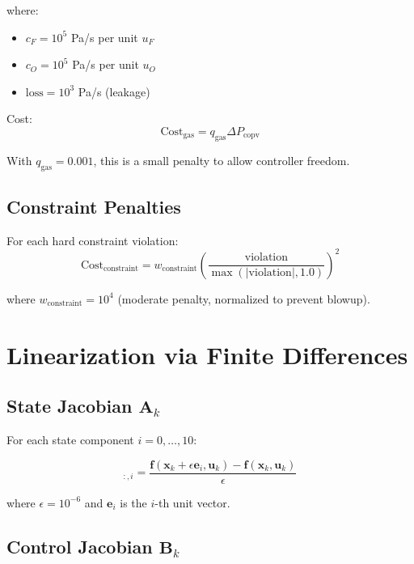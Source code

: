 \documentclass[11pt,a4paper]{article}
\begin{document}
where:
\begin{itemize}
    \item $c_F = 10^5$ Pa/s per unit $u_F$
    \item $c_O = 10^5$ Pa/s per unit $u_O$
    \item $\text{loss} = 10^3$ Pa/s (leakage)
\end{itemize}

Cost:
\begin{equation}
\text{Cost}_{\text{gas}} = q_{\text{gas}} \Delta P_{\text{copv}}
\end{equation}

With $q_{\text{gas}} = 0.001$, this is a small penalty to allow controller freedom.

\subsection{Constraint Penalties}

For each hard constraint violation:
\begin{equation}
\text{Cost}_{\text{constraint}} = w_{\text{constraint}} \left(\frac{\text{violation}}{\max(|\text{violation}|, 1.0)}\right)^2
\end{equation}

where $w_{\text{constraint}} = 10^4$ (moderate penalty, normalized to prevent blowup).

\section{Linearization via Finite Differences}

\subsection{State Jacobian $\mathbf{A}_k$}

For each state component $i = 0, \ldots, 10$:

\begin{equation}
[\mathbf{A}_k]_{:,i} = \frac{\mathbf{f}(\mathbf{x}_k + \epsilon \mathbf{e}_i, \mathbf{u}_k) - \mathbf{f}(\mathbf{x}_k, \mathbf{u}_k)}{\epsilon}
\end{equation}

where $\epsilon = 10^{-6}$ and $\mathbf{e}_i$ is the $i$-th unit vector.

\subsection{Control Jacobian $\mathbf{B}_k$}
\end{document}
